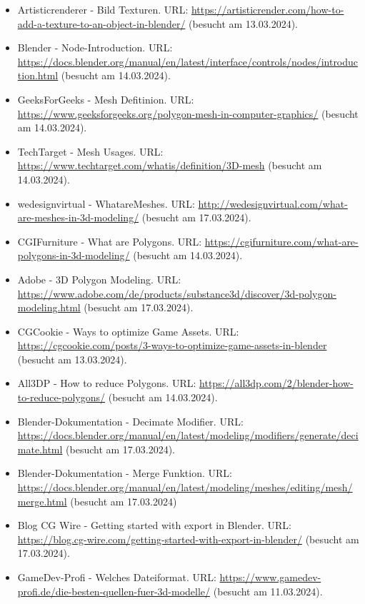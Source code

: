 \begin{itemize}[leftmargin=0pt]
    \item Artisticrenderer - Bild Texturen. {\scriptsize URL:} \url{https://artisticrender.com/how-to-add-a-texture-to-an-object-in-blender/} (besucht am 13.03.2024).
    \item Blender - Node-Introduction. {\scriptsize URL:} \url{https://docs.blender.org/manual/en/latest/interface/controls/nodes/introduction.html} (besucht am 14.03.2024).
    \item GeeksForGeeks - Mesh Defitinion. {\scriptsize URL:} \url{https://www.geeksforgeeks.org/polygon-mesh-in-computer-graphics/} (besucht am 14.03.2024).
    \item TechTarget - Mesh Usages. {\scriptsize URL:} \url{https://www.techtarget.com/whatis/definition/3D-mesh} (besucht am 14.03.2024).
    \item wedesignvirtual - WhatareMeshes. {\scriptsize URL:} \url{http://wedesignvirtual.com/what-are-meshes-in-3d-modeling/} (besucht am 17.03.2024).
    \item CGIFurniture - What are Polygons. {\scriptsize URL:} \url{https://cgifurniture.com/what-are-polygons-in-3d-modeling/} (besucht am 14.03.2024).
    \item Adobe - 3D Polygon Modeling. {\scriptsize URL:} \url{https://www.adobe.com/de/products/substance3d/discover/3d-polygon-modeling.html} (besucht am 17.03.2024).
    \item CGCookie - Ways to optimize Game Assets. {\scriptsize URL:} \url{https://cgcookie.com/posts/3-ways-to-optimize-game-assets-in-blender} (besucht am 13.03.2024).
    \item All3DP - How to reduce Polygons. {\scriptsize URL:} \url{https://all3dp.com/2/blender-how-to-reduce-polygons/} (besucht am 14.03.2024).
    \item Blender-Dokumentation - Decimate Modifier. {\scriptsize URL:} \url{https://docs.blender.org/manual/en/latest/modeling/modifiers/generate/decimate.html} (besucht am 17.03.2024).
    \item Blender-Dokumentation - Merge Funktion. {\scriptsize URL:} \url{https://docs.blender.org/manual/en/latest/modeling/meshes/editing/mesh/merge.html} (besucht am 17.03.2024)
    \item Blog CG Wire - Getting started with export in Blender. {\scriptsize URL:} \url{https://blog.cg-wire.com/getting-started-with-export-in-blender/} (besucht am 17.03.2024).
    \item GameDev-Profi - Welches Dateiformat. {\scriptsize URL:} \url{https://www.gamedev-profi.de/die-besten-quellen-fuer-3d-modelle/} (besucht am 11.03.2024).

\end{itemize}
